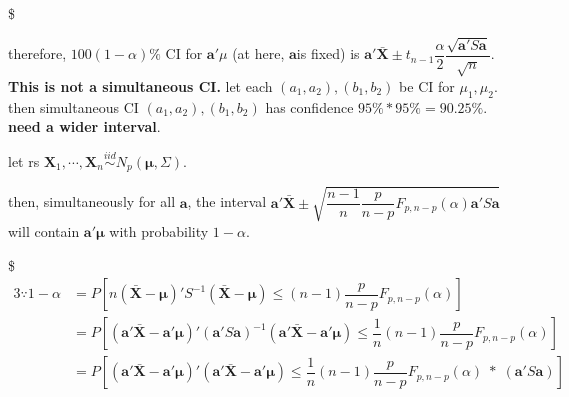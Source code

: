 \documentclass[
]{book}
\begin{document}
{{{\begin{align*}
\end{align*}
\$

therefore, \(100(1-\alpha)\%\) CI for \(\pmb a ' \mu\) (at here, \(\pmb a\)is fixed) is \(\pmb a ' \bar {\pmb X} \pm t_{n-1} \dfrac {\alpha} {2} \dfrac{\sqrt{\pmb a ' S \pmb a} } {\sqrt{n}}\). \textbf{This is not a simultaneous CI.} let each \((a_1 , a_2), (b_1, b_2)\) be CI for \(\mu_1 , \mu_2\). then simultaneous CI \((a_1 , a_2), (b_1, b_2)\) has confidence \(95\% \ast 95\% = 90.25\%\). \textbf{need a wider interval}.

let rs \(\pmb X_1 , \cdots, \pmb X_n \overset {iid} {\sim} N_p (\pmb \mu , \Sigma)\).

then, simultaneously for all \(\pmb a\), the interval \(\pmb a ' \bar {\pmb X} \pm \sqrt{\dfrac{n-1}{n} \dfrac{p}{n-p} F_{p,n-p} (\alpha) \pmb a ' S \pmb a}\) will contain \(\pmb a ' \pmb \mu\) with probability \(1-\alpha\).

\$
\begin{alignat*}{3}
\because 1-\alpha 


&=  

P \left[
n 
(\bar {\pmb X } - \pmb \mu)'
S^{-1}
(\bar {\pmb X } - \pmb \mu)


\le

(n-1) \dfrac {p}{n-p} F_{p,n-p} (\alpha)

\right] \\





&=  

P \left[




(\pmb a' \bar {\pmb X } - \pmb a' \pmb \mu)'
(\pmb a' S \pmb a)^{-1}
(\pmb a' \bar {\pmb X } - \pmb a' \pmb \mu)


\le


\dfrac{1}{n} (n-1) \dfrac {p}{n-p} F_{p,n-p} (\alpha)


\right] \\





&=  

P \left[

(\pmb a' \bar {\pmb X } - \pmb a' \pmb \mu)'
(\pmb a' \bar {\pmb X } - \pmb a' \pmb \mu)

\le

\dfrac{1}{n} (n-1) \dfrac {p}{n-p} F_{p,n-p} (\alpha)
\; \ast \;
(\pmb a' S \pmb a)

\right] 


\end{alignat*}}}}
\end{document}
